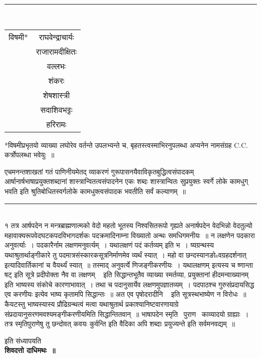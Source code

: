\documentclass[11pt, openany]{book}
\begin{document}
\begin{multicols}{2}
\noindent
\rule{1\linewidth}{0.5pt}\\

\begin{tabular}{c c}
विषमी* & राघवेन्द्राचार्यः\\
& राजारामदीक्षितः\\
& वल्लभः\\
& शंकरः\\
& शेषशास्त्री\\
& सदाशिवभट्टः\\
& हरिरामः
\end{tabular}

*विषमीप्रभृतयो व्याख्या लघोरेव वर्तन्ते उपलभ्यन्ते च, बृहतस्त्वस्माभिरनुपलब्धा अप्यनेन नामसंग्रह C.C. कर्त्रोपलब्धा भवेयुः~॥
\end{multicols}

एचमनन्तशाखतां गतं पाणिनीयमेतद् व्याकरणं गुरूपासनयैवाविकृतबुद्धित्वसंपादकम् आर्षानार्षभाषाप्रयुक्तशब्दानां शास्त्रान्वितत्वसंपादनेन एकः शब्दः शास्त्रान्वितः सुप्रयुक्तः स्वर्गे लोके कामधुग् भवति इति श्रुतिबोधितस्वर्गलोके कामधुक्त्वसंपादक भवतीति सर्वं कल्याणम्~॥

\noindent
\rule{1\linewidth}{0.5pt}\\

१ तत्र आर्षपदेन न मन्त्रब्राह्मणात्मको वेदो महतो भूतस्य निश्वसितरूपो गृह्यते अनार्षपदेन वेदभिन्नो वेदतुल्यो महावाक्यरूपवेदघटकपदविभागदर्शकः पदक्रमादिनाम्ना विख्यातो अन्थः समधिगमनीयः~॥ {\qt न लक्षणेन पदकारा अनुवर्त्याः~। पदकारैर्नाम लक्षणमनुवर्त्यम्~। यथालक्षणं पदं कर्तव्यम्} इति भ~। ष्यग्रन्थस्य यथाश्रुतार्थाङ्गीकारे तु पदमात्रसंस्कारकसूत्रनिर्माणमेव व्यर्थं स्यात्~। {\qt महो वा छन्दस्यानङोsवग्रहदर्शनात्} इत्यादिवार्तिकानां च वैयर्थ्यं स्यात्~॥ तस्माद् {\qt अनुवर्त्ये} णिजङ्गीकरणीयः~। {\qt यथालक्षणम्} इत्यस्य {\qt च} ष्णान्ता षट् इति सूत्रे प्रदीपोक्ता {\qt नैव वा लक्षणम् \textendash\ } इति सिद्धान्तभूतैव व्याख्या स्मर्तव्या, {\qt प्रयुक्तानां हीदमन्वाख्यानम्} इति भाष्यस्य संकोचे कारणाभावात्~। तथा च पदानुसार्येव लक्षणमुपज्ञातव्यम्~। पदपाठश्च गुरुसंप्रदायसिद्ध एव करणीयः इत्येव भाष्य कृतामपि सिद्धान्तः~॥ अत एव {\qt पृषोदरादीनि \textendash\ } इति सूत्रस्थभाष्येण न विरोधः~॥ कैयटस्तु भाष्यस्यास्य प्रौढिग्रन्थत्वं मत्वा यथाश्रुतार्थ प्रकाश्यानिष्टवारणायाग्रे संप्रदायानुसरणमवश्यमङ्गीकरणीयमिति सिद्धान्तितवान्~॥ भाषापदेन {\qt स्मृति \textendash\ पुराण \textendash\ काव्यादयो ग्राह्याः~। तत्र स्मृतिपुराणेषु तु छन्दोवत् कवयः कुर्वन्ति} इति वैदिका अपि शब्दाः प्रयुज्यन्ते इति सर्वमनवद्यम्~॥

\begin{center}
{\small इति संध्यापयति \textendash\ }\\

\textbf{\large शिवदत्तो दाधिमथः~॥}
\end{center}
\end{document}
